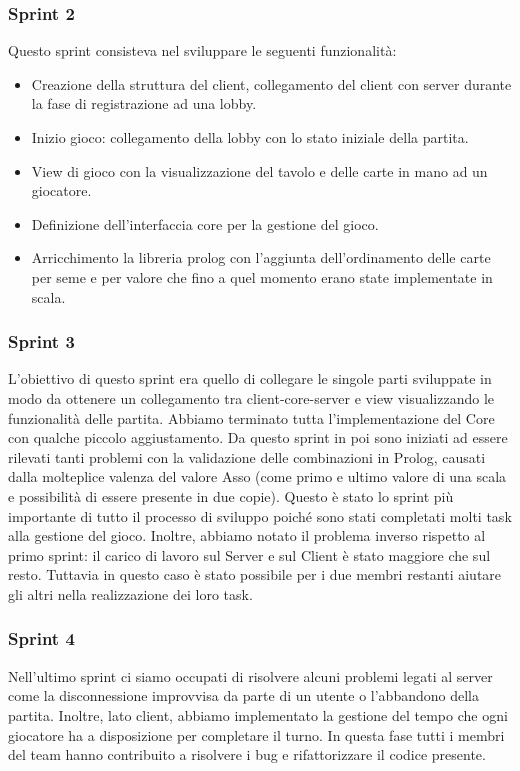 \subsubsection{Sprint 2}
Questo sprint consisteva nel sviluppare le seguenti funzionalità:
\begin{itemize}
    \item Creazione della struttura del client, collegamento del client con server durante la fase di registrazione ad una lobby.
    \item Inizio gioco: collegamento della lobby con lo stato iniziale della partita.
    \item View di gioco con la visualizzazione del tavolo e delle carte in mano ad un giocatore.
    \item Definizione dell’interfaccia core per la gestione del gioco.
    \item Arricchimento la libreria prolog con l’aggiunta dell’ordinamento delle carte per seme e per valore che fino a quel momento erano state implementate in scala.
\end{itemize}

\subsubsection{Sprint 3}
L’obiettivo di questo sprint era quello di collegare le singole parti sviluppate in modo da ottenere un collegamento tra client-core-server e view visualizzando le funzionalità delle partita.
Abbiamo terminato tutta l’implementazione del Core con qualche piccolo aggiustamento.
Da questo sprint in poi sono iniziati ad essere rilevati tanti problemi con la validazione delle combinazioni in Prolog, causati dalla molteplice valenza del valore Asso (come primo e ultimo valore di una scala e possibilità di essere presente in due copie).
\newline
Questo è stato lo sprint più importante di tutto il processo di sviluppo poiché sono stati completati molti task alla gestione del gioco.
Inoltre, abbiamo notato il problema inverso rispetto al primo sprint: il carico di lavoro sul Server e sul Client è stato maggiore che sul resto.
Tuttavia in questo caso è stato possibile per i due membri restanti aiutare gli altri nella realizzazione dei loro task.

\subsubsection{Sprint 4}
Nell’ultimo sprint ci siamo occupati di risolvere alcuni problemi legati al server come la disconnessione improvvisa da parte di un utente o l’abbandono della partita.
Inoltre, lato client, abbiamo implementato la gestione del tempo che ogni giocatore ha a disposizione per completare il turno.
In questa fase tutti i membri del team hanno contribuito a risolvere i bug e rifattorizzare il codice presente.

